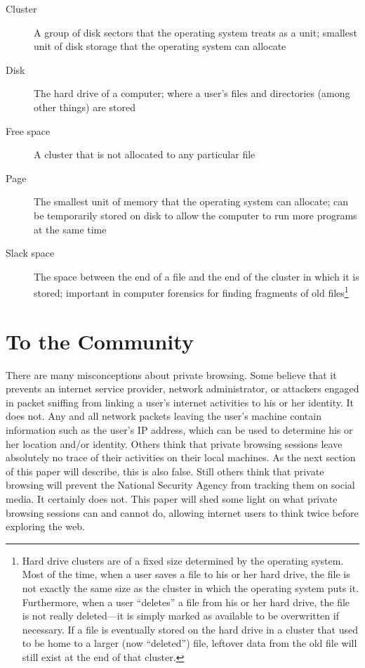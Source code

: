 \documentclass[pdftex,letterpaper,titlepage,12pt]{article}
\begin{document}
	\begin{description}
	  \item[Cluster] A group of disk sectors that the operating system
	  treats as a unit; smallest unit of disk storage that the operating
	  system can allocate
	  \item[Disk] The hard drive of a computer; where a user's files and
	  directories (among other things) are stored
	  \item[Free space] A cluster that is not allocated to any particular 
	  file
	  \item[Page] The smallest unit of memory that the operating system can
	  allocate; can be temporarily stored on disk to allow the computer to run
	  more programs at the same time
	  \item[Slack space] The space between the end of a file and the end of 
	  the cluster in which it is stored; important in computer forensics for
	  finding fragments of old files\footnote{Hard drive clusters are of a 
	  fixed size determined by the operating system. Most of the time, when a 
	  user saves a file to his or her hard drive, the file is not exactly the 
	  same size as the cluster in which the operating system puts it. 
	  Furthermore, when a user ``deletes'' a file from his or her hard drive, 
	  the file is not really deleted---it is simply marked as available to be
      overwritten if necessary. If a file is eventually stored on the hard 
	  drive in a cluster that used to be home to a larger (now ``deleted'') 
	  file, leftover data from the old file will still exist at the end of that
      cluster.}
	\end{description}
    
  \section{To the Community}
  There are many misconceptions about private browsing. Some believe that it
  prevents an internet service provider, network administrator, or attackers
  engaged in packet sniffing from linking a user's internet activities to his
  or her identity. It does not. Any and all network packets leaving the user's
  machine contain information such as the user's IP address, which can be used
  to determine his or her location and/or identity. Others think that private
  browsing sessions leave absolutely no trace of their activities on their
  local machines. As the next section of this paper will describe, this is also
  false. Still others think that private browsing will prevent the National
  Security Agency from tracking them on social media. It certainly does not.
  This paper will shed some light on what private browsing sessions can and
  cannot do, allowing internet users to think twice before exploring the web.
\end{document}
